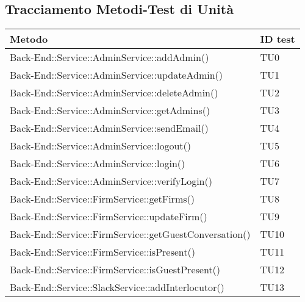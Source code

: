 \documentclass[../PianoDiQualifica.tex]{subfiles}
\begin{document}
	\subsection{Tracciamento Metodi-Test di Unità}
	\begin{longtable}[c] {>{\centering\arraybackslash}p{9cm} >{\centering\arraybackslash}p{3cm}}
		\toprule
		\centerline{\textbf{Metodo}} & \centerline{\textbf{ID test}}  \\
			\midrule
	 		Back-End::Service::AdminService::addAdmin()& TU0 \\
	 		\addlinespace[0.3em]
			\midrule
			\addlinespace[0.3em]
			Back-End::Service::AdminService::updateAdmin()& TU1 \\ 
			\addlinespace[0.3em]
			\midrule
			\addlinespace[0.3em]
 			Back-End::Service::AdminService::deleteAdmin()& TU2 \\ 
 			\addlinespace[0.3em]
			\midrule
			\addlinespace[0.3em]
 			Back-End::Service::AdminService::getAdmins()& TU3 \\ 
 			\addlinespace[0.3em]
			\midrule
			\addlinespace[0.3em]
			Back-End::Service::AdminService::sendEmail()& TU4 \\ 
 			\addlinespace[0.3em]
			\midrule
			\addlinespace[0.3em] 
 			Back-End::Service::AdminService::logout()& TU5 \\
 			\addlinespace[0.3em]
			\midrule
			\addlinespace[0.3em] 
 			Back-End::Service::AdminService::login()& TU6 \\
 			\addlinespace[0.3em]
			\midrule
			\addlinespace[0.3em]
 			Back-End::Service::AdminService::verifyLogin()& TU7 \\
 			\addlinespace[0.3em]
			\midrule
			\addlinespace[0.3em]
 			Back-End::Service::FirmService::getFirms()& TU8 \\ 
 			\addlinespace[0.3em]
			\midrule
			\addlinespace[0.3em]
			Back-End::Service::FirmService::updateFirm()& TU9 \\ 
 			\addlinespace[0.3em]
			\midrule
			\addlinespace[0.3em]
			Back-End::Service::FirmService::getGuestConversation()& TU10 \\ 
 			\addlinespace[0.3em]
			\midrule
			\addlinespace[0.3em]
			Back-End::Service::FirmService::isPresent()& TU11 \\ 
 			\addlinespace[0.3em]
			\midrule
			\addlinespace[0.3em]
			Back-End::Service::FirmService::isGuestPresent()& TU12 \\ 
 			\addlinespace[0.3em]
			\midrule
			\addlinespace[0.3em]
			Back-End::Service::SlackService::addInterlocutor()& TU13 \\ 

\end{longtable}
\end{document}
